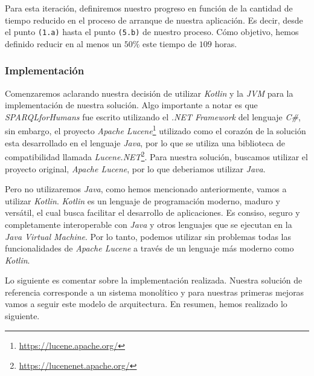 Para esta iteración, definiremos nuestro progreso en función de la cantidad de tiempo reducido en el proceso de arranque de nuestra aplicación. Es decir, desde el punto \texttt{(1.a)} hasta el punto \texttt{(5.b)} de nuestro proceso. Cómo objetivo, hemos definido reducir en al menos un $50\%$ este tiempo de $109$ horas.

\subsubsection*{Implementación}

Comenzaremos aclarando nuestra decisión de utilizar \textit{Kotlin} y la \textit{JVM} para la implementación de nuestra solución. Algo importante a notar es que \textit{SPARQLforHumans} fue escrito utilizando el \textit{.NET Framework} del lenguaje \textit{C\#}, sin embargo, el proyecto \textit{Apache Lucene}\footnote{\href{https://lucene.apache.org/}{https://lucene.apache.org/}} utilizado como el corazón de la solución esta desarrollado en el lenguaje \textit{Java}, por lo que se utiliza una biblioteca de compatibilidad llamada \textit{Lucene.NET}\footnote{\href{https://lucenenet.apache.org/}{https://lucenenet.apache.org/}}. Para nuestra solución, buscamos utilizar el proyecto original, \textit{Apache Lucene}, por lo que deberiamos utilizar \textit{Java}.

Pero no utilizaremos \textit{Java}, como hemos mencionado anteriormente, vamos a utilizar \textit{Kotlin}. \textit{Kotlin} es un lenguaje de programación moderno, maduro y versátil, el cual busca facilitar el desarrollo de aplicaciones. Es consiso, seguro y completamente interoperable con \textit{Java} y otros lenguajes que se ejecutan en la \textit{Java Virtual Machine}. Por lo tanto, podemos utilizar sin problemas todas las funcionalidades de \textit{Apache Lucene} a través de un lenguaje más moderno como \textit{Kotlin}.

Lo siguiente es comentar sobre la implementación realizada. Nuestra solución de referencia corresponde a un sistema monolítico y para nuestras primeras mejoras vamos a seguir este modelo de arquitectura. En resumen, hemos realizado lo siguiente.

